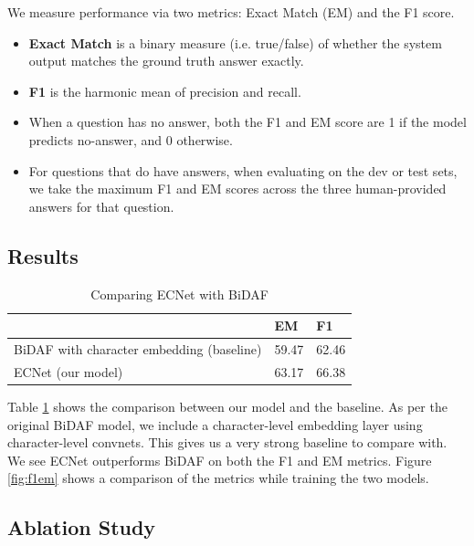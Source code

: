 We measure performance via two metrics: Exact Match (EM) and the F1 score.

\begin{itemize}
\item \textbf{Exact Match} is a binary measure (i.e. true/false) of whether the system output matches the ground truth answer exactly.
\item \textbf{F1} is the harmonic mean of precision and recall.
\item When a question has no answer, both the F1 and EM score are 1 if the model predicts no-answer, and 0 otherwise.
\item For questions that do have answers, when evaluating on the dev or test sets, we take the maximum F1 and EM scores across the three human-provided answers for that question.
\end{itemize}

\subsection{Results}
\label{subsec:results}

\begin{table}[]
\caption{Comparing ECNet with BiDAF}
\label{table:results}
\centering
\begin{tabular}{lll}
																									& EM    & F1    \\ \hline
BiDAF with character embedding (baseline)				  & 59.47 & 62.46 \\
ECNet (our model)																	& 63.17 & 66.38 \\ \hline

\end{tabular}
\end{table}

Table \ref{table:results} shows the comparison between our model and the baseline. As per the original BiDAF model, we include a character-level embedding layer using character-level convnets. This gives us a very strong baseline to compare with. We see ECNet outperforms BiDAF on both the F1 and EM metrics. Figure \ref{fig:f1em} shows a comparison of the metrics while training the two models.


\subsection{Ablation Study}
\label{subsec:ablationstudy}


